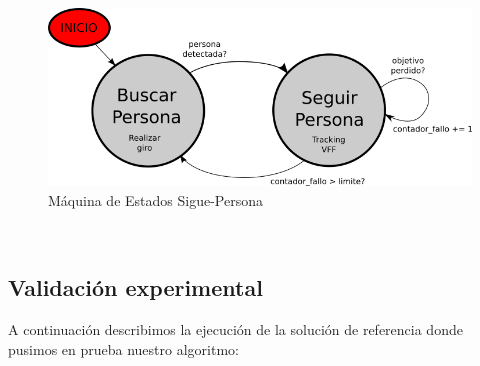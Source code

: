 \begin{figure} [H]
  \begin{center}
    \includegraphics[width=12cm]{imagenes/cap6/maquina-estados.png}
  \end{center}
  \caption[Máquina de Estados Sigue-Persona]{Máquina de Estados Sigue-Persona}
  \label{fig:maquina_estados}
\end{figure}\


\subsection{Validación experimental}
\label{subsec:validacion_experimental_sim}

A continuación describimos la ejecución de la solución de referencia donde pusimos en prueba nuestro algoritmo:

